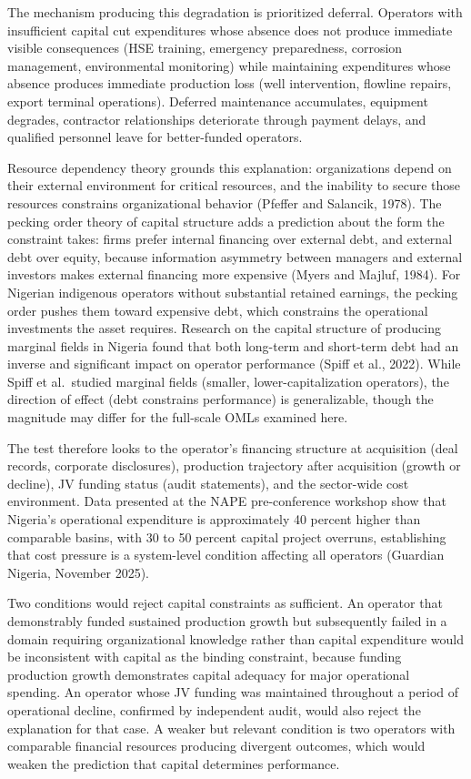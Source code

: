\documentclass[twoside,fontset=lmodern]{mitthesis}
\begin{document}
The mechanism producing this degradation is prioritized deferral.
Operators with insufficient capital cut expenditures whose absence does
not produce immediate visible consequences (HSE training, emergency
preparedness, corrosion management, environmental monitoring) while
maintaining expenditures whose absence produces immediate production
loss (well intervention, flowline repairs, export terminal operations).
Deferred maintenance accumulates, equipment degrades, contractor
relationships deteriorate through payment delays, and qualified
personnel leave for better-funded operators.

Resource dependency theory grounds this explanation: organizations
depend on their external environment for critical resources, and the
inability to secure those resources constrains organizational behavior
(Pfeffer and Salancik, 1978). The pecking order theory of capital
structure adds a prediction about the form the constraint takes: firms
prefer internal financing over external debt, and external debt over
equity, because information asymmetry between managers and external
investors makes external financing more expensive (Myers and Majluf,
1984). For Nigerian indigenous operators without substantial retained
earnings, the pecking order pushes them toward expensive debt, which
constrains the operational investments the asset requires. Research on
the capital structure of producing marginal fields in Nigeria found that
both long-term and short-term debt had an inverse and significant impact
on operator performance (Spiff et al., 2022). While Spiff et al.~studied
marginal fields (smaller, lower-capitalization operators), the direction
of effect (debt constrains performance) is generalizable, though the
magnitude may differ for the full-scale OMLs examined here.

The test therefore looks to the operator's financing structure at
acquisition (deal records, corporate disclosures), production trajectory
after acquisition (growth or decline), JV funding status (audit
statements), and the sector-wide cost environment. Data presented at the
NAPE pre-conference workshop show that Nigeria's operational expenditure
is approximately 40 percent higher than comparable basins, with 30 to 50
percent capital project overruns, establishing that cost pressure is a
system-level condition affecting all operators (Guardian Nigeria,
November 2025).

Two conditions would reject capital constraints as sufficient. An
operator that demonstrably funded sustained production growth but
subsequently failed in a domain requiring organizational knowledge
rather than capital expenditure would be inconsistent with capital as
the binding constraint, because funding production growth demonstrates
capital adequacy for major operational spending. An operator whose JV
funding was maintained throughout a period of operational decline,
confirmed by independent audit, would also reject the explanation for
that case. A weaker but relevant condition is two operators with
comparable financial resources producing divergent outcomes, which would
weaken the prediction that capital determines performance.
\end{document}
